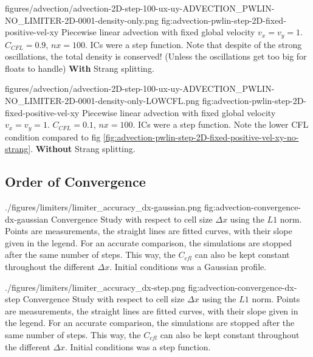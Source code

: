 \quickfigcap
	{figures/advection/advection-2D-step-100-ux-uy-ADVECTION_PWLIN-NO_LIMITER-2D-0001-density-only.png}
	{fig:advection-pwlin-step-2D-fixed-positive-vel-xy}
	{	
		Piecewise linear advection with fixed global velocity $v_x = v_y = 1$. $C_{CFL} = 0.9$, $nx = 100$. 
		ICs were a step function. 
		Note that despite of the strong oscillations, the total density is conserved! 
		(Unless the oscillations get too big for floats to handle)
		\textbf{With} Strang splitting.
	}










\quickfigcap
	{figures/advection/advection-2D-step-100-ux-uy-ADVECTION_PWLIN-NO_LIMITER-2D-0001-density-only-LOWCFL.png}
	{fig:advection-pwlin-step-2D-fixed-positive-vel-xy}
	{
		Piecewise linear advection with fixed global velocity $v_x = v_y = 1$. 
		$C_{CFL} = 0.1$, $nx = 100$. 
		ICs were a step function. 
		Note the lower CFL condition compared to fig \ref{fig:advection-pwlin-step-2D-fixed-positive-vel-xy-no-strang}.
		\textbf{Without} Strang splitting.
	}


















\subsection{Order of Convergence}




\quickfigcap
	{./figures/limiters/limiter_accuracy_dx-gaussian.png}
	{fig:advection-convergence-dx-gaussian}
	{
		Convergence Study with respect to cell size $\Delta x$ using the $L1$ norm.
		Points are measurements, the straight lines are fitted curves, with their slope given in the legend.
		For an accurate comparison, the simulations are stopped after the same number of steps.
		This way, the $C_{cfl}$ can also be kept constant throughout the different $\Delta x$.
		Initial conditions was a Gaussian profile.
	}

\quickfigcap
	{./figures/limiters/limiter_accuracy_dx-step.png}
	{fig:advection-convergence-dx-step}
	{
		Convergence Study with respect to cell size $\Delta x$ using the $L1$ norm.
		Points are measurements, the straight lines are fitted curves, with their slope given in the legend.
		For an accurate comparison, the simulations are stopped after the same number of steps.
		This way, the $C_{cfl}$ can also be kept constant throughout the different $\Delta x$.
		Initial conditions was a step function.
	}
	



